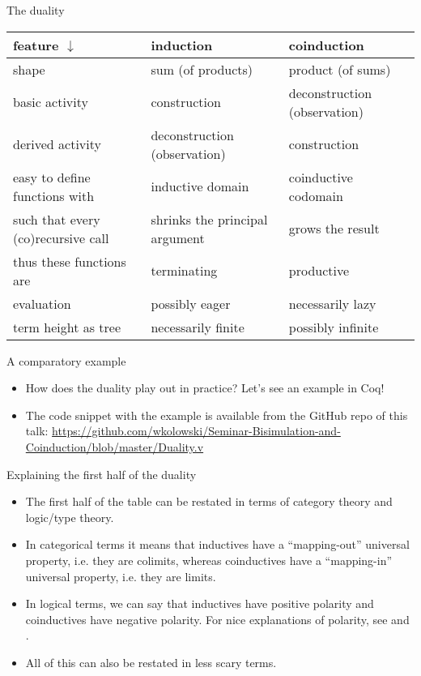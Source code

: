 \documentclass{beamer}
\begin{document}
\begin{frame}{The duality}
\begin{tabular}{ | p{3cm} | p{3cm} | p{3cm} | }
	\hline
	feature $\downarrow$ & induction & coinduction \\\hline
	shape & sum (of products) & product (of sums) \\\hline
	basic activity & construction & deconstruction (observation) \\\hline
	derived activity & deconstruction (observation) & construction \\\hline
	easy to define functions with & inductive domain & coinductive codomain \\\hline
	such that every (co)recursive call & shrinks the principal argument & grows the result \\\hline
	thus these functions are & terminating & productive \\\hline
	evaluation & possibly eager & necessarily lazy \\\hline
	term height as tree & necessarily finite & possibly infinite \\\hline
\end{tabular}
\end{frame}

\begin{frame}{A comparatory example}
\begin{itemize}
	\item How does the duality play out in practice? Let's see an example in Coq!
	\item The code snippet with the example is available from the GitHub repo of this talk: \url{https://github.com/wkolowski/Seminar-Bisimulation-and-Coinduction/blob/master/Duality.v}
\end{itemize}
\end{frame}

\begin{frame}{Explaining the first half of the duality}
\begin{itemize}
	\item The first half of the table can be restated in terms of category theory and logic/type theory.
	\item In categorical terms it means that inductives have a ``mapping-out'' universal property, i.e. they are colimits, whereas coinductives have a ``mapping-in'' universal property, i.e. they are limits.
	\item In logical terms, we can say that inductives have positive polarity and coinductives have negative polarity. For nice explanations of polarity, see \href{https://existentialtype.wordpress.com/2012/08/25/polarity-in-type-theory/}{\color{blue}{Polarity in Type Theory}} and \href{http://noamz.org/talks/logpolpro.pdf}{\color{blue}{Polarity in Proof Theory and Programming}}.
	\item All of this can also be restated in less scary terms.
\end{itemize}
\end{frame}
\end{document}
